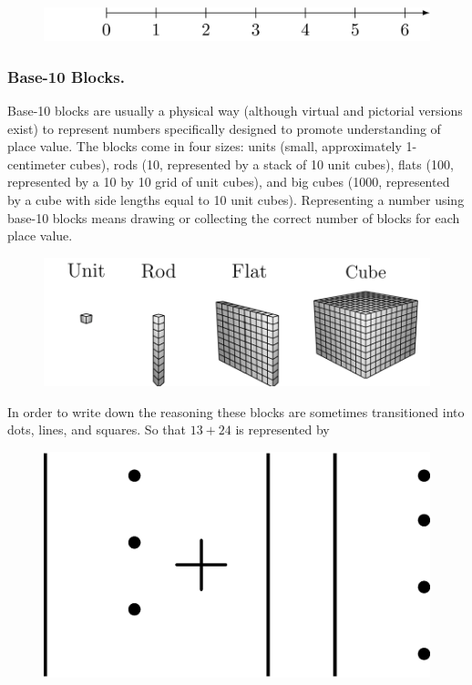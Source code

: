 \documentclass[
]{book}
\theoremstyle{definition}
\theoremstyle{definition}
\theoremstyle{definition}
\theoremstyle{remark}
\begin{document}
\begin{figure}

{\centering \includegraphics[width=0.8\linewidth]{tikz/number-line-representation} 

}

\end{figure}

\hypertarget{base-10-blocks.}{%
\subsubsection*{Base-10 Blocks.}\label{base-10-blocks.}}

Base-10 blocks are usually a physical way (although virtual and pictorial versions exist) to represent numbers specifically designed to promote understanding of place value. The blocks come in four sizes: units (small, approximately 1-centimeter cubes), rods (10, represented by a stack of 10 unit cubes), flats (100, represented by a 10 by 10 grid of unit cubes), and big cubes (1000, represented by a cube with side lengths equal to 10 unit cubes). Representing a number using base-10 blocks means drawing or collecting the correct number of blocks for each place value.

\begin{figure}

{\centering \includegraphics[width=0.8\linewidth]{tikz/base10blocks} 

}

\end{figure}

In order to write down the reasoning these blocks are sometimes transitioned into dots, lines, and squares. So that \(13+24\) is represented by

\begin{figure}

{\centering \includegraphics[width=0.6\linewidth]{tikz/base10block-addition} 

}

\end{figure}
\end{document}
